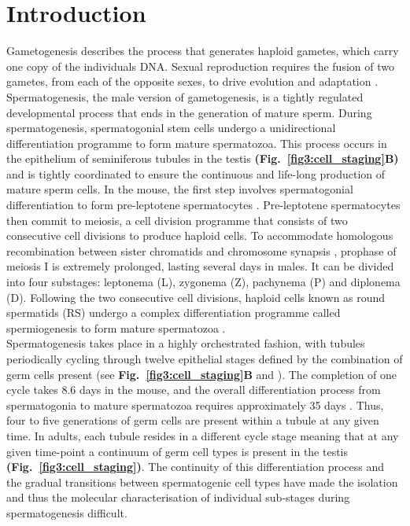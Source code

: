 
\section{Introduction}

Gametogenesis describes the process that generates haploid gametes, which carry one copy of the individuals DNA. Sexual reproduction requires the fusion of two gametes, from each of the opposite sexes, to drive evolution and adaptation \citep{McDonald2016}. Spermatogenesis, the male version of gametogenesis, is a tightly regulated developmental process that ends in the generation of mature sperm. During spermatogenesis, spermatogonial stem cells undergo a unidirectional differentiation programme to form mature spermatozoa. This process occurs in the epithelium of seminiferous tubules in the testis \textbf{(Fig.~\ref{fig3:cell_staging}B)} and is tightly coordinated to ensure the continuous and life-long production of mature sperm cells. In the mouse, the first step involves spermatogonial differentiation to form pre-leptotene spermatocytes \citep{Oakberg1971, DeRooij1973, DeRooij2000}. Pre-leptotene spermatocytes then commit to meiosis, a cell division programme that consists of two consecutive cell divisions to produce haploid cells. To accommodate homologous recombination between sister chromatids and chromosome synapsis \citep{Marston2004}, prophase of meiosis I is extremely prolonged, lasting several days in males. It can be divided into four substages: leptonema (L), zygonema (Z), pachynema (P) and diplonema (D). Following the two consecutive cell divisions, haploid cells known as round spermatids (RS) undergo a complex differentiation programme called spermiogenesis to form mature spermatozoa \citep{Oakberg1956}. \\

Spermatogenesis takes place in a highly orchestrated fashion, with tubules periodically cycling through twelve epithelial stages defined by the combination of germ cells present (see \textbf{Fig.~\ref{fig3:cell_staging}B} and \citep{Oakberg1956}). The completion of one cycle takes 8.6 days in the mouse, and the overall differentiation process from spermatogonia to mature spermatozoa requires approximately 35 days \citep{Oakberg1956a}. Thus, four to five generations of germ cells are present within a tubule at any given time. In adults, each tubule resides in a different cycle stage meaning that at any given time-point a continuum of germ cell types is present in the testis \textbf{(Fig.~\ref{fig3:cell_staging})}. The continuity of this differentiation process and the gradual transitions between spermatogenic cell types have made the isolation and thus the molecular characterisation of individual sub-stages during spermatogenesis difficult.

